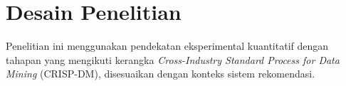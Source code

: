 \section{Desain Penelitian}
Penelitian ini menggunakan pendekatan eksperimental kuantitatif dengan
tahapan yang mengikuti kerangka \emph{Cross-Industry Standard Process for
Data Mining} (CRISP-DM), disesuaikan dengan konteks sistem rekomendasi.
